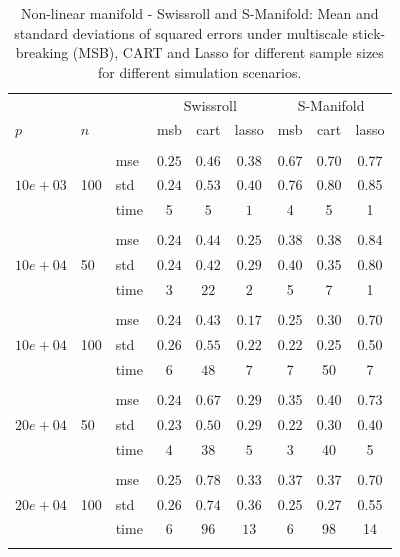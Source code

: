 \documentclass{article} %
\begin{document}
\begin{table}[t]
\caption{Non-linear manifold - Swissroll and S-Manifold: Mean and standard deviations of squared errors under multiscale stick-breaking (MSB), CART and Lasso for different sample sizes for different simulation scenarios.}\label{table:swiss}
\vskip 0.15in
\begin{center}
\begin{small}
\begin{sc}
\begin{tabular}{lllcccccc}
\hline
&&&\multicolumn{3}{c}{Swissroll}&\multicolumn{3}{c}{S-Manifold}\\

$p$&$n$& & msb&cart& lasso & msb&cart& lasso\\
\\
\multirow{3}{*}{$10e+03$}&\multirow{3}{*}{100}&mse &$0.25$&$0.46$&$0.38$&0.67&0.70&0.77\\
&&std & $0.24$ & $0.53$&$0.40$&0.76&0.80&0.85\\
&&time & 5& $5$&$1$&4 & 5 & 1 \\

\\
\multirow{3}{*}{$10e+04$}&\multirow{3}{*}{50}&mse &$0.24$&$0.44$&$0.25$&0.38&0.38&0.84\\
&&std & $0.24$ & $0.42$&$0.29$&0.40&0.35&0.80\\
&&time & 3 & $22$&$2$ &5&7&1\\

\\
\multirow{3}{*}{$10e+04$}&\multirow{3}{*}{100}&mse &$0.24$ & $0.43$&$0.17$&0.25&0.30&0.70\\
&&std & $0.26$&$0.55$&$0.22$&0.22 & 0.25 &0.50\\
&&time&$6$&$48$&$7$&7 & 50 & 7\\

\\

\multirow{3}{*}{$20e+04$}&\multirow{3}{*}{50}&mse &$0.24$&$0.67$&$0.29$&0.35&0.40&0.73\\
&&std & $0.23$ & $0.50$& $0.29$&0.22&0.30 &0.40\\
&&time & 4& $38$& $5$ & 3 & 40 & 5 \\
\\
\multirow{3}{*}{$20e+04$}&\multirow{3}{*}{100}&mse &$0.25$&$0.78$&$0.33$&0.37&0.37&0.70\\
&&std & $0.26$ & $0.74$&$0.36$&0.25&0.27&0.55\\
&&time &6 &$96$&$13$ &6&98&14\\
\\


\end{tabular}
\end{sc}
\end{small}
\end{center}
\end{table}
\end{document}

